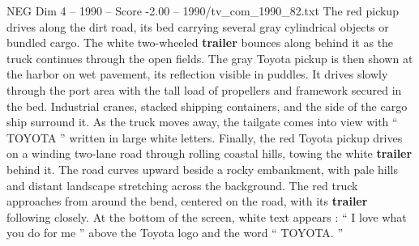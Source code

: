 \begin{textsample}{NEG Dim 4 – 1990 – Score -2.00 – 1990/tv\_com\_1990\_82.txt}
The red pickup drives along the dirt road, its bed carrying several gray cylindrical objects or bundled cargo.
The white two-wheeled \textbf{trailer} bounces along behind it as the truck continues through the open fields.
The gray Toyota pickup is then shown at the harbor on wet pavement, its reflection visible in puddles.
It drives slowly through the port area with the tall load of propellers and framework secured in the bed.
Industrial cranes, stacked shipping containers, and the side of the cargo ship surround it.
As the truck moves away, the tailgate comes into view with “ TOYOTA ” written in large white letters.
Finally, the red Toyota pickup drives on a winding two-lane road through rolling coastal hills, towing the white \textbf{trailer} behind it.
The road curves upward beside a rocky embankment, with pale hills and distant landscape stretching across the background.
The red truck approaches from around the bend, centered on the road, with its \textbf{trailer} following closely.
At the bottom of the screen, white text appears : “ I love what you do for me ” above the Toyota logo and the word “ TOYOTA. ”

\end{textsample}
